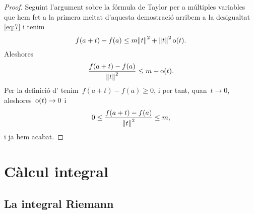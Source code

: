 \documentclass[../../main.tex]{subfiles}
\begin{document}
\begin{proposition}
\begin{proof}
            Seguint l'argument sobre la fórmula de Taylor per a múltiples variables que hem fet a la primera meitat d'aquesta demostració arribem a la desigualtat \eqref{eq:7} i tenim
            \[
                f(a+t)-f(a)\leq m\norm{t}^{2}+\norm{t}^{2}\omicron(t).
            \]
            Aleshores
            \[
                \frac{f(a+t)-f(a)}{\norm{t}^{2}}\leq m+\omicron(t).
            \]
            Per la definició d' tenim~\(f(a+t)-f(a)\geq0\), i per tant, quan~\(t\to0\), aleshores~\(\operatorname{o}(t)\to0\) i
            \[
                0\leq\frac{f(a+t)-f(a)}{\norm{t}^{2}}\leq m,
            \]
            i ja hem acabat.
        \end{proof}
    \end{proposition}
\chapter{Càlcul integral}
\section{La integral Riemann}
\end{document}
